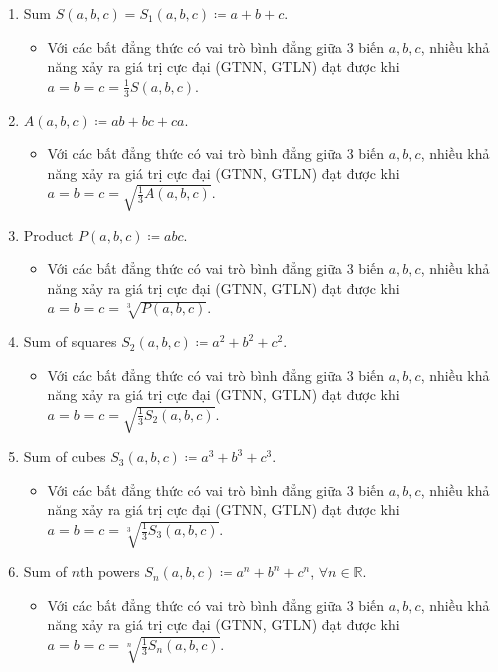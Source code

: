 \documentclass{article}
\begin{document}
\begin{enumerate}
	\item Sum $S(a,b,c) = S_1(a,b,c)\coloneqq a + b + c$.
	\begin{itemize}
		\item Với các bất đẳng thức có vai trò bình đẳng giữa 3 biến $a,b,c$, nhiều khả năng xảy ra giá trị cực đại (GTNN, GTLN) đạt được khi $a = b = c = \frac{1}{3}S(a,b,c)$.
	\end{itemize}
	\item $A(a,b,c)\coloneqq ab + bc + ca$.
	\begin{itemize}
		\item Với các bất đẳng thức có vai trò bình đẳng giữa 3 biến $a,b,c$, nhiều khả năng xảy ra giá trị cực đại (GTNN, GTLN) đạt được khi $a = b = c = \sqrt{\frac{1}{3}A(a,b,c)}$.
	\end{itemize}
	\item Product $P(a,b,c)\coloneqq abc$.
	\begin{itemize}
		\item Với các bất đẳng thức có vai trò bình đẳng giữa 3 biến $a,b,c$, nhiều khả năng xảy ra giá trị cực đại (GTNN, GTLN) đạt được khi $a = b = c = \sqrt[3]{P(a,b,c)}$.
	\end{itemize}
	\item Sum of squares $S_2(a,b,c)\coloneqq a^2 + b^2 + c^2$.
	\begin{itemize}
		\item Với các bất đẳng thức có vai trò bình đẳng giữa 3 biến $a,b,c$, nhiều khả năng xảy ra giá trị cực đại (GTNN, GTLN) đạt được khi $a = b = c = \sqrt{\frac{1}{3}S_2(a,b,c)}$.
	\end{itemize}
	\item Sum of cubes $S_3(a,b,c)\coloneqq a^3 + b^3 + c^3$.
	\begin{itemize}
		\item Với các bất đẳng thức có vai trò bình đẳng giữa 3 biến $a,b,c$, nhiều khả năng xảy ra giá trị cực đại (GTNN, GTLN) đạt được khi $a = b = c = \sqrt[3]{\frac{1}{3}S_3(a,b,c)}$.
	\end{itemize}
	\item Sum of $n$th powers $S_n(a,b,c)\coloneqq a^n + b^n + c^n$, $\forall n\in\mathbb{R}$.
	\begin{itemize}
		\item Với các bất đẳng thức có vai trò bình đẳng giữa 3 biến $a,b,c$, nhiều khả năng xảy ra giá trị cực đại (GTNN, GTLN) đạt được khi $a = b = c = \sqrt[n]{\frac{1}{3}S_n(a,b,c)}$.
	\end{itemize}
\end{enumerate}
\end{document}
